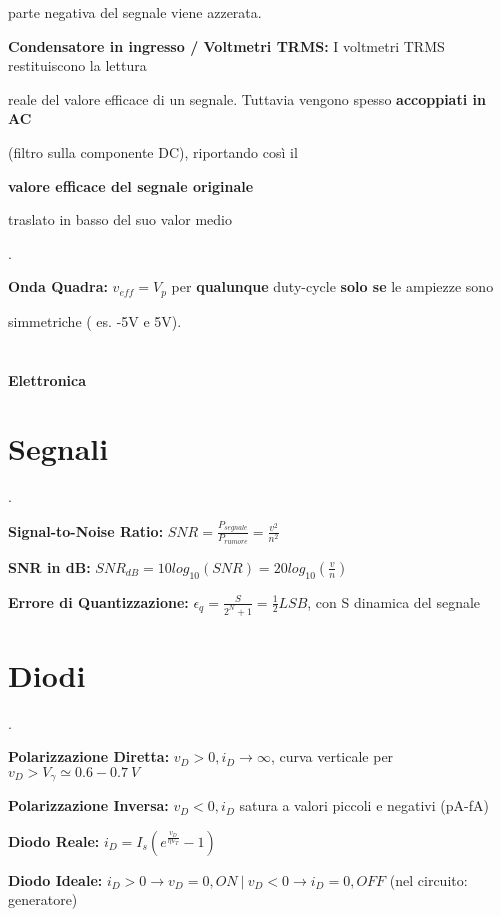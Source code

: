 \documentclass[12pt]{extarticle}
\begin{document}
parte negativa del segnale viene azzerata.
\newpage

{\bf Condensatore in ingresso / Voltmetri TRMS:} I voltmetri TRMS restituiscono la lettura

reale del valore efficace di un segnale. Tuttavia vengono spesso {\bf accoppiati in AC} 

(filtro sulla componente DC), riportando così il {\bf valore efficace del segnale originale

traslato in basso del suo valor medio}.

{\bf Onda Quadra:} $\displaystyle v_{eff} = V_p$ per {\bf qualunque} duty-cycle {\bf solo se} le ampiezze sono 

simmetriche ( es. -5V e 5V).
\\\\\\

{\bf \Huge Elettronica}
\setcounter{section}{0}
\section{Segnali}.


{\bf Signal-to-Noise Ratio:} $\displaystyle SNR = \frac{P_{segnale}}{P_{rumore}} = \frac{v^2}{n^2}$ 

{\bf SNR in dB:} $\displaystyle SNR_{dB} = 10log_{10}(SNR) = 20log_{10}(\frac{v}{n})$

{\bf Errore di Quantizzazione:} $\displaystyle \epsilon_q = \frac{S}{2^N+1} = \frac{1}{2}LSB $, con S dinamica del segnale

\section{Diodi}.

{\bf Polarizzazione Diretta:} $\displaystyle v_D > 0, i_D \to \infty $, curva verticale per $v_D > V_\gamma \simeq 0.6-0.7 \ V$

{\bf Polarizzazione Inversa:} $\displaystyle v_D < 0, i_D$ satura a valori piccoli e negativi (pA-fA)

{\bf Diodo Reale:} $\displaystyle i_D = I_s(e^{\frac{v_D}{\eta V_T}}- 1)$

{\bf Diodo Ideale:} $i_D > 0 \to v_D = 0, ON \ \big | \ v_D < 0 \to i_D = 0, OFF $ (nel circuito: generatore)
\end{document}

